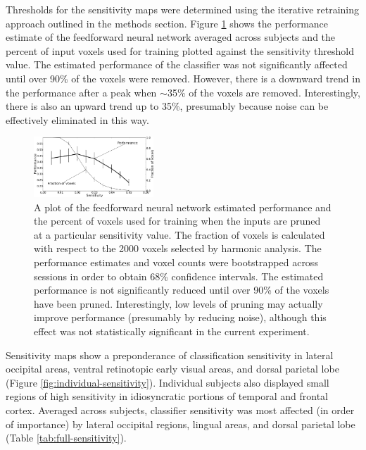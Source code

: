 \documentclass[5p,authoryear]{elsarticle}
\begin{document}
Thresholds for the sensitivity maps were determined using the iterative retraining approach outlined in the methods section.
Figure \ref{fig:sensitivity-cutoff} shows the performance estimate of the feedforward neural network averaged across subjects and the percent of input voxels used for training plotted against the sensitivity threshold value.
The estimated performance of the classifier was not significantly affected until over 90\% of the voxels were removed.
However, there is a downward trend in the performance after a peak when $\sim$35\% of the voxels are removed.
Interestingly, there is also an upward trend up to 35\%, presumably because noise can be effectively eliminated in this way.

\begin{figure}
\centering
\includegraphics[width=0.4\textwidth]{figures/performance-verse-sensitivity-cutoff}
\caption{A plot of the feedforward neural network estimated performance and the percent of voxels used for training when the inputs are pruned at a particular sensitivity value.
The fraction of voxels is calculated with respect to the 2000 voxels selected by harmonic analysis.
The performance estimates and voxel counts were bootstrapped across sessions in order to obtain 68\% confidence intervals.
The estimated performance is not significantly reduced until over 90\% of the voxels have been pruned.
Interestingly, low levels of pruning may actually improve performance (presumably by reducing noise), although this effect was not statistically significant in the current experiment.} 
\label{fig:sensitivity-cutoff}
\end{figure}

Sensitivity maps show a preponderance of classification sensitivity in
lateral occipital areas, ventral retinotopic early visual areas, and dorsal parietal lobe (Figure \ref{fig:individual-sensitivity}). 
Individual subjects also displayed small regions of high sensitivity in idiosyncratic portions of temporal and frontal cortex. 
Averaged across subjects, classifier sensitivity was most affected (in order of importance) by lateral occipital regions, lingual areas, and dorsal parietal lobe (Table \ref{tab:full-sensitivity}). 
\end{document}
